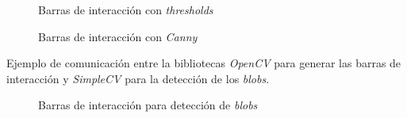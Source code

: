 \begin{figure}[H]
  \caption{Barras de interacción con \emph{thresholds}}
  \centering \setlength\fboxsep{0pt} \setlength\fboxrule{0.5pt}
\end{figure}
\begin{figure}[H]
  \caption{Barras de interacción con \emph{Canny}}
  \centering \setlength\fboxsep{0pt} \setlength\fboxrule{0.5pt}
\end{figure}

Ejemplo de comunicación entre la bibliotecas \emph{OpenCV} para
generar las barras de interacción y \emph{SimpleCV} para la detección
de los \emph{blobs}.

\begin{figure}[H]
  \caption{Barras de interacción para detección de \emph{blobs}}
  \centering \setlength\fboxsep{0pt} \setlength\fboxrule{0.5pt}
\end{figure}
